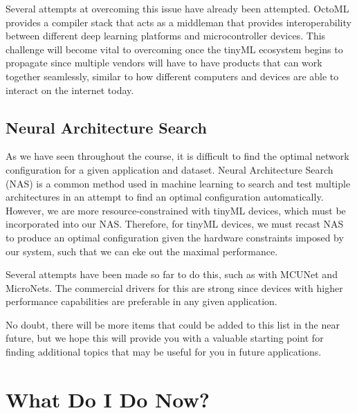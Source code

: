     Several attempts at overcoming this issue have already been attempted. OctoML provides a compiler stack that acts as a middleman that provides interoperability between different deep learning platforms and microcontroller devices. This challenge will become vital to overcoming once the tinyML ecosystem begins to propagate since multiple vendors will have to have products that can work together seamlessly, similar to how different computers and devices are able to interact on the internet today.
    
\subsection{Neural Architecture Search}

    As we have seen throughout the course, it is difficult to find the optimal network configuration for a given application and dataset. Neural Architecture Search (NAS) is a common method used in machine learning to search and test multiple architectures in an attempt to find an optimal configuration automatically. However, we are more resource-constrained with tinyML devices, which must be incorporated into our NAS. Therefore, for tinyML devices, we must recast NAS to produce an optimal configuration given the hardware constraints imposed by our system, such that we can eke out the maximal performance.
    
    Several attempts have been made so far to do this, such as with MCUNet and MicroNets. The commercial drivers for this are strong since devices with higher performance capabilities are preferable in any given application.
    
    No doubt, there will be more items that could be added to this list in the near future, but we hope this will provide you with a valuable starting point for finding additional topics that may be useful for you in future applications.    
    
    
\section{What Do I Do Now?}

